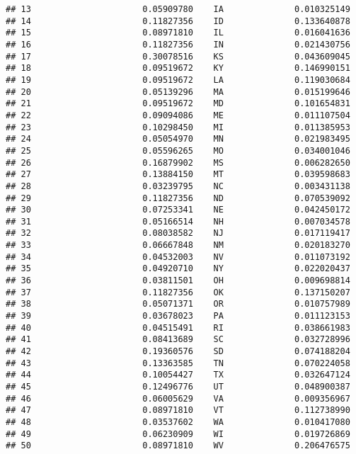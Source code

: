 \documentclass{article}\usepackage[]{graphicx}\usepackage[]{color}
\makeatletter
\newenvironment{kframe}{%
 \def\at@end@of@kframe{}%
 \ifinner\ifhmode%
  \def\at@end@of@kframe{\end{minipage}}%
  \begin{minipage}{\columnwidth}%
 \fi\fi%
 \def\FrameCommand##1{\hskip\@totalleftmargin \hskip-\fboxsep
 \colorbox{shadecolor}{##1}\hskip-\fboxsep
     \hskip-\linewidth \hskip-\@totalleftmargin \hskip\columnwidth}%
 \MakeFramed {\advance\hsize-\width
   \@totalleftmargin\z@ \linewidth\hsize
   \@setminipage}}%
 {\par\unskip\endMakeFramed%
 \at@end@of@kframe}
\newenvironment{knitrout}{}{} %
\makeatother
\begin{document}
\begin{knitrout}
\begin{kframe}
\begin{verbatim}
## 13                      0.05909780    IA              0.010325149
## 14                      0.11827356    ID              0.133640878
## 15                      0.08971810    IL              0.016041636
## 16                      0.11827356    IN              0.021430756
## 17                      0.30078516    KS              0.043609045
## 18                      0.09519672    KY              0.146990151
## 19                      0.09519672    LA              0.119030684
## 20                      0.05139296    MA              0.015199646
## 21                      0.09519672    MD              0.101654831
## 22                      0.09094086    ME              0.011107504
## 23                      0.10298450    MI              0.011385953
## 24                      0.05054970    MN              0.021983495
## 25                      0.05596265    MO              0.034001046
## 26                      0.16879902    MS              0.006282650
## 27                      0.13884150    MT              0.039598683
## 28                      0.03239795    NC              0.003431138
## 29                      0.11827356    ND              0.070539092
## 30                      0.07253341    NE              0.042450172
## 31                      0.05166514    NH              0.007034578
## 32                      0.08038582    NJ              0.017119417
## 33                      0.06667848    NM              0.020183270
## 34                      0.04532003    NV              0.011073192
## 35                      0.04920710    NY              0.022020437
## 36                      0.03811501    OH              0.009698814
## 37                      0.11827356    OK              0.137150207
## 38                      0.05071371    OR              0.010757989
## 39                      0.03678023    PA              0.011123153
## 40                      0.04515491    RI              0.038661983
## 41                      0.08413689    SC              0.032728996
## 42                      0.19360576    SD              0.074188204
## 43                      0.13363585    TN              0.070224058
## 44                      0.10054427    TX              0.032647124
## 45                      0.12496776    UT              0.048900387
## 46                      0.06005629    VA              0.009356967
## 47                      0.08971810    VT              0.112738990
## 48                      0.03537602    WA              0.010417080
## 49                      0.06230909    WI              0.019726869
## 50                      0.08971810    WV              0.206476575

\end{verbatim}
\end{kframe}
\end{knitrout}
\end{document}
